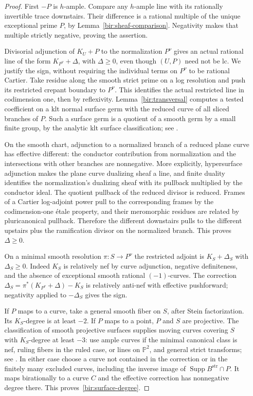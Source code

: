 \documentclass[11pt,letterpaper]{article}
\newcommand{\PP}{\mathbb{P}}
\DeclareMathOperator{\Supp}{Supp}
\theoremstyle{definition}
\theoremstyle{remark}
\begin{document}
\begin{proof}
First $-P$ is $h$-ample.  Compare any $h$-ample line with its
rationally invertible trace downstairs.  Their difference is a
rational multiple of the unique exceptional prime $P$, by
Lemma~\ref{bir:sheaf-comparison}.  Negativity makes that multiple
strictly negative, proving the assertion.

Divisorial adjunction of $K_U+P$ to the normalization $P^\nu$ gives
an actual rational line of the form $K_{P^\nu}+\Delta$, with
$\Delta\geq0$, even though $(U,P)$ need not be lc.  We justify the
sign, without requiring the individual terms on $P^\nu$ to be
rational Cartier.  Take residue along the smooth strict prime on a
log resolution and push its restricted crepant boundary to $P^\nu$.
This identifies the actual restricted line in codimension one, then
by reflexivity.  Lemma~\ref{bir:transversal} computes a tested
coefficient on a klt normal surface germ with the reduced curve of
all sliced branches of $P$.  Such a surface germ is a quotient of a
smooth germ by a small finite group, by the analytic klt surface
classification; see \cite[Chapter~4]{BirationalGeometry}.

On the smooth chart, adjunction to a normalized branch of a reduced
plane curve has effective different: the conductor contribution
from normalization and the intersections with other branches are
nonnegative.  More explicitly, hypersurface adjunction makes the
plane curve dualizing sheaf a line, and finite duality identifies the
normalization's dualizing sheaf with its pullback multiplied by the
conductor ideal.  The quotient pullback of the reduced divisor is
reduced.  Frames of a Cartier log-adjoint power pull to the
corresponding frames by the codimension-one \mbox{\'etale} property,
and their meromorphic residues are related by pluricanonical
pullback.  Therefore the different downstairs pulls to the
different upstairs plus the ramification divisor on the normalized
branch.  This proves $\Delta\geq0$.

On a minimal smooth resolution $\pi:S\to P^\nu$ the restricted
adjoint is $K_S+\Delta_S$ with $\Delta_S\geq0$.  Indeed $K_S$ is
relatively nef by curve adjunction, negative definiteness, and the
absence of exceptional smooth rational $(-1)$-curves.  The correction
$\Delta_S=\pi^*(K_{P^\nu}+\Delta)-K_S$ is relatively anti-nef with
effective pushforward; negativity applied to $-\Delta_S$ gives the
sign.

If $P$ maps to a curve, take a general smooth fiber on $S$, after
Stein factorization.  Its $K_S$-degree is at least $-2$.  If $P$ maps
to a point, $P$ and $S$ are projective.  The classification of smooth
projective surfaces supplies moving curves covering $S$ with
$K_S$-degree at least $-3$: use ample curves if the minimal canonical
class is nef, ruling fibers in the ruled case, or lines on $\PP^2$,
and general strict transforms; see \cite{BHPV}.  In either case
choose a curve not contained in the correction or in the finitely
many excluded curves, including the inverse image of
$\Supp B^{\mathrm{str}}\cap P$.  It maps birationally to a curve $C$
and the effective correction has nonnegative degree there.  This
proves~\eqref{bir:surface-degree}.
\end{proof}
\end{document}
